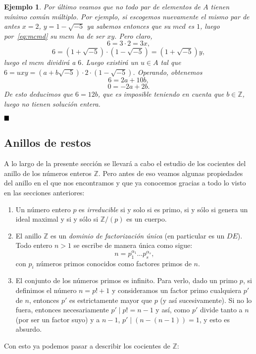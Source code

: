 \documentclass[12pt]{article}
\newtheorem{example}{Ejemplo}[theorem]
\begin{document}
\begin{example}
Por último veamos que no todo par de elementos de $A$ tienen mínimo común múltiplo. Por ejemplo, si escogemos nuevamente el mismo par de antes $x = 2$, $y = 1- \sqrt{-5}$ ya sabemos entonces que su $mcd$ es $1$, luego por~\ref{eq:mcmd} su $mcm$ ha de ser $xy$. Pero claro, $$6 = 3 \cdot 2 = 3x, $$ $$6 = (1 + \sqrt{-5}) \cdot (1 - \sqrt{-5}) = (1 + \sqrt{-5})y,$$ luego el $mcm$ dividirá a $6$. Luego existirá un $u \in A$ tal que $6 = uxy = (a+ b\sqrt{-5}) \cdot 2 \cdot (1- \sqrt{-5})$. Operando, obtenemos $$6 = 2a + 10b,$$ $$0 = -2a + 2b.$$ De esto deducimos que $6 = 12b$, que es imposible teniendo en cuenta que $b \in \mathbb{Z}$, luego no tienen solución entera.

\end{example}
$\hfill \blacksquare$

\subsection{Anillos de restos}

A lo largo de la presente sección se llevará a cabo el estudio de los cocientes del anillo de los números enteros $\mathbb{Z}$. Pero antes de eso veamos algunas propiedades del anillo en el que nos encontramos y que ya conocemos gracias a todo lo visto en las secciones anteriores: 
\begin{enumerate}
\item Un número entero $p$ es \textit{irreducible} si y solo si es primo, si y sólo si genera un ideal maximal y si y sólo si $\mathbb{Z}/(p)$ es un cuerpo.
\item El anillo $\mathbb{Z}$ es un \textit{dominio de factorización única} (en particular es un $DE$). Todo entero $n >1$ se escribe de manera única como sigue: $$n = p_{1}^{\alpha_{1}} \ldots p_{s}^{\alpha_{s}},$$ con $p_{i}$ números primos conocidos como factores primos de $n$.
\item El conjunto de los números primos es infinito. Para verlo, dado un primo $p$, si definimos el número $n = p!+1$ y consideramos un factor primo cualquiera $p'$ de $n$, entonces $p'$ es estrictamente mayor que $p$ (y así sucesivamente). Si no lo fuera, entonces necesariamente $p' \mid p! = n-1$ y así, como $p'$ divide tanto a $n$ (por ser un factor suyo) y a $n-1$, $p' \mid (n-(n-1)) = 1$, y esto es absurdo.
\end{enumerate}

Con esto ya podemos pasar a describir los cocientes de $\mathbb{Z}$:
\end{document}
